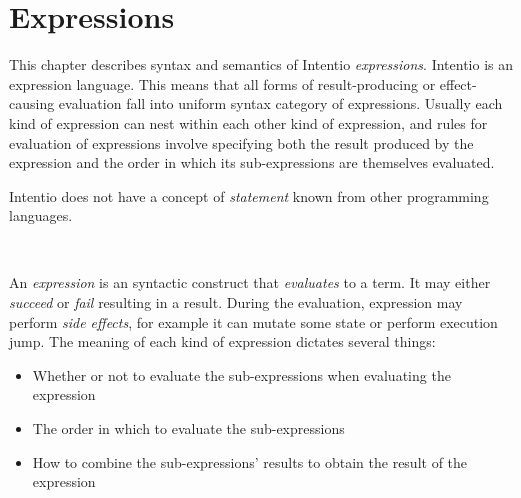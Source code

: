 \chapter{Expressions}

This chapter describes syntax and semantics of Intentio \emph{expressions}. Intentio is an expression language. This means that all forms of result-producing or effect-causing evaluation fall into uniform syntax category of expressions. Usually each kind of expression can nest within each other kind of expression, and rules for evaluation of expressions involve specifying both the result produced by the expression and the order in which its sub-expressions are themselves evaluated.

Intentio does not have a concept of \emph{statement} known from other programming languages.

\begin{bnf}
   \eq    {}                        
            \gorln {}                    
            \gorln {}                      
            \gorln {}                       
            \gorln {}                      
            \gorln \term{(} \  \ \term{)}     
            \gorln {}                       
            \gorln {}                       
            \gorln {}                         
            \gorln {}                     
\end{bnf}

An \emph{expression} is an syntactic construct that \emph{evaluates} to a term. It may either \emph{succeed} or \emph{fail} resulting in a result. During the evaluation, expression may perform \emph{side effects}, for example it can mutate some state or perform execution jump. The meaning of each kind of expression dictates several things:

\begin{itemize}
  \item Whether or not to evaluate the sub-expressions when evaluating the expression
  \item The order in which to evaluate the sub-expressions
  \item How to combine the sub-expressions' results to obtain the result of the expression
\end{itemize}


